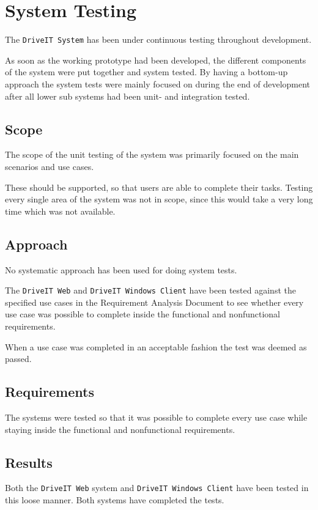 \section{System Testing}
The \texttt{DriveIT System} has been under continuous testing throughout development.

As soon as the working prototype had been developed, the different components of the system were put together and system tested. 
By having a bottom-up approach the system tests were mainly focused on during the end of development after all lower sub systems had been unit- and integration tested.

\subsection{Scope}
The scope of the unit testing of the system was primarily focused on the main scenarios and use cases. 

These should be supported, so that users are able to complete their tasks. Testing every single area of the system was not in scope, since this would take a very long time which was not available.

\subsection{Approach}
No systematic approach has been used for doing system tests. 

The \texttt{DriveIT Web} and \texttt{DriveIT Windows Client} have been tested against the specified use cases in the Requirement Analysis Document to see whether every use case was possible to complete inside the functional and nonfunctional requirements.

When a use case was completed in an acceptable fashion the test was deemed as passed.

\subsection{Requirements}
The systems were tested so that it was possible to complete every use case while staying inside the functional and nonfunctional requirements.

\subsection{Results}
Both the \texttt{DriveIT Web} system and \texttt{DriveIT Windows Client} have been tested in this loose manner. 
Both systems have completed the tests.